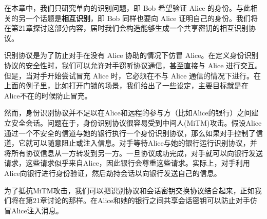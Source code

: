\begin{snote}[单向证明与相互识别.]
在本章中，我们只研究单向的识别问题，即 Bob 希望验证 Alice 的身份。与此相关的另一个话题是\textbf{相互识别}，即 Bob 同样也要向 Alice 证明自己的身份。我们将在第21章探讨这部分内容，届时我们会构造能够生成一个共享密钥的相互识别协议。
\end{snote}

\begin{snote}[身份识别协议的安全性和局限性.]
识别协议是为了防止对手在没有 Alice 协助的情况下仿冒 Alice。在定义身份识别协议的安全性时，我们可以允许对手窃听协议通信，甚至直接与 Alice 进行交互。但是，当对手开始尝试冒充 Alice 时，它必须在不与 Alice 通信的情况下进行。在上面的例子里，比如打开门锁的场景，我们给出了一些设定，主要目标就是在Alice不在的时候防止冒充。

然而，身份识别协议并不足以在Alice和远程的参与方（比如Alice的银行）之间建立安全会话。问题在于，身份识别协议很容易受到中间人(MiTM)攻击。假设Alice通过一个不安全的信道与她的银行执行一个身份识别协议，那么如果对手控制了信道，它就可以随意阻止或注入信息。对手等待Alice与她的银行运行识别协议，并将所有协议信息从一方转发到另一方。一旦协议成功完成，对手就可以向银行发送请求，这些请求似乎来自Alice，因此银行会尊重这些请求。实际上，对手利用Alice向银行进行身份验证，然后劫持会话以向银行发送自己的信息。

为了抵抗MiTM攻击，我们可以把识别协议和会话密钥交换协议结合起来，正如我们将在第21章讨论的那样。在Alice和她的银行之间共享会话密钥可以防止对手仿冒Alice注入消息。	
\end{snote}










